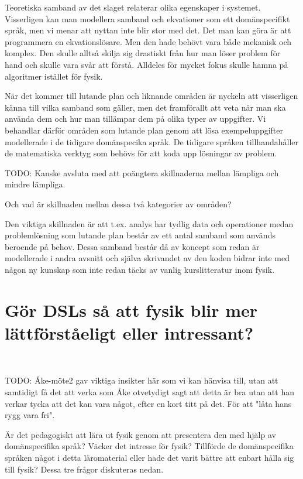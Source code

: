 \begin{binge}
Teoretiska samband av det slaget relaterar olika egenskaper i systemet.
Visserligen kan man modellera samband och ekvationer som ett domänspecifikt
språk, men vi menar att nyttan inte blir stor med det. Det man kan göra är att
programmera en ekvationslösare. Men den hade behövt vara både mekanisk och
komplex. Den skulle alltså skilja sig drastiskt från hur man löser problem för
hand och skulle vara svår att förstå. Alldeles för mycket fokus skulle hamna på
algoritmer istället för fysik.

När det kommer till lutande plan och liknande områden är nyckeln att visserligen
känna till vilka samband som gäller, men det framförallt att veta när man ska
använda dem och hur man tillämpar dem på olika typer av uppgifter. Vi behandlar
därför områden som lutande plan genom att lösa exempeluppgifter modellerade i de
tidigare domänspecika språk. De tidigare språken tillhandahåller de matematiska
verktyg som behövs för att koda upp lösningar av problem.


TODO: Kanske avsluta med att poängtera skillnaderna mellan lämpliga och mindre lämpliga.

Och vad är skillnaden mellan dessa två kategorier av områden?

Den viktiga skillnaden är att t.ex. analys har tydlig data och operationer 
medan problemlösning som lutande plan består av ett antal samband som används
beroende på behov. Dessa samband består då av koncept som redan är modellerade i
andra avsnitt och själva skrivandet av den koden bidrar inte med någon ny
kunskap som inte redan täcks av vanlig kurslitteratur inom fysik.

\section{Gör DSLs så att fysik blir mer lättförståeligt eller
intressant?}~\label{sec:bara_fysik}

TODO: Åke-möte2 gav viktiga insikter här som vi kan hänvisa till, utan att samtidigt få det att verka som Åke otvetydigt sagt att detta är bra utan att han verkar tycka att det kan vara något, efter en kort titt på det. För att "låta hans rygg vara fri".

Är det pedagogiskt att lära ut fysik genom att presentera den med hjälp av domänspecifika språk? Väcker det intresse för fysik? Tillförde de domänspecifika språken något i detta läromaterial eller hade det varit bättre att enbart hålla sig till fysik? Dessa tre frågor diskuteras nedan.


\end{binge}
